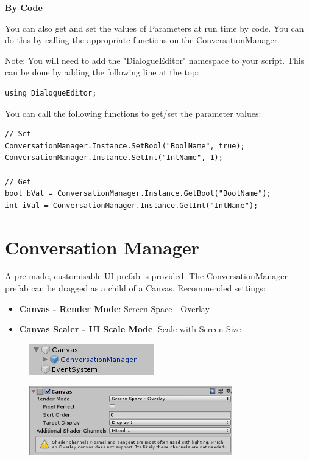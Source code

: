 \documentclass[a4paper,12pt]{article}
\begin{document}
\textbf{By Code}
\bigskip

You can also get and set the values of Parameters at run time by code. You can do this by calling the appropriate functions on the ConversationManager.
\newline

Note: You will need to add the "DialogueEditor" namespace to your script. This can be done by adding the following line at the top:
\bigskip

\begin{lstlisting}
using DialogueEditor;
\end{lstlisting}
\bigskip

You can call the following functions to get/set the parameter values:
\bigskip

\begin{lstlisting}
// Set
ConversationManager.Instance.SetBool("BoolName", true);
ConversationManager.Instance.SetInt("IntName", 1);

// Get
bool bVal = ConversationManager.Instance.GetBool("BoolName");
int iVal = ConversationManager.Instance.GetInt("IntName");
\end{lstlisting}
\bigskip

\newpage


\section{Conversation Manager}
\hypertarget{_conversationmanager}{}
A pre-made, customisable UI prefab is provided. The ConversationManager prefab can be dragged as a child of a Canvas. 
\newline
Recommended settings:
\begin{itemize}
\setlength\itemsep{1pt}
	\item \textbf{Canvas - Render Mode}: Screen Space - Overlay
	\item \textbf{Canvas Scaler - UI Scale Mode}: Scale with Screen Size
\end{itemize}

\begin{figure}[h]
\centering
\includegraphics[keepaspectratio]{img/CanvasInHierarchy.png}
\end{figure}

\begin{figure}[h]
\centering
\includegraphics[width=250pt, keepaspectratio]{img/CanvasComponent.png}
\end{figure}
\end{document}
